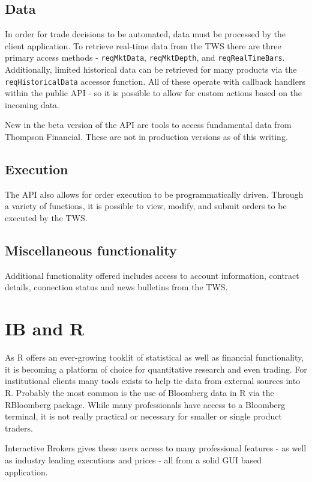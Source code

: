 \documentclass{article}
\begin{document}
\subsection{Data}
In order for trade decisions to be automated, data
must be processed by the client application. To retrieve
real-time data from the TWS there are three primary
access methods - {\tt reqMktData},
{\tt reqMktDepth}, and {\tt reqRealTimeBars}.  Additionally,
limited historical data can be retrieved for many products
via the {\tt reqHistoricalData} accessor function. All of these
operate with callback handlers within the public API - so
it is possible to allow for custom actions based on the
incoming data.

New in the beta version of the API are tools to access
fundamental data from Thompson Financial.  These are
not in production versions as of this writing.

\subsection{Execution}
The API also allows for order execution to be programmatically
driven. Through a variety of functions, it is possible
to view, modify, and submit orders to be executed by
the TWS.

\subsection{Miscellaneous functionality}
Additional functionality offered includes access
to account information, contract details, connection
status and news bulletins from the TWS.

\section{IB and R}
As R offers an ever-growing tooklit of statistical as well
as financial functionality, it is becoming a platform
of choice for quantitative research and even trading. For
institutional clients many tools exists to help
tie data from external sources into R. Probably the most
common is the use of Bloomberg data in R via the
RBloomberg package.  While many professionals have
access to a Bloomberg terminal, it is not really practical
or necessary for smaller or single product traders.

Interactive Brokers gives these users access to many
professional features - as well as industry leading
executions and prices - all from a solid GUI
based application.
\end{document}
